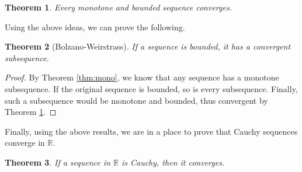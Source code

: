 \documentclass[11pt]{article}
\newcommand{\R}{\ensuremath{\mathbb R}}
\theoremstyle{plain}
\newtheorem{thm}{Theorem}[section]
\theoremstyle{definition}
\theoremstyle{remark}
\begin{document}
\begin{thm}
    Every monotone and bounded sequence converges.
    \label{thm:monobound}
\end{thm}
Using the above ideas, we can prove the following.
\begin{thm}[Bolzano-Weirstrass]
    If a sequence is bounded, it has a convergent subsequence.
    \label{thm:bw}
\end{thm}
\begin{proof}
    By Theorem \ref{thm:mono}, we know that any sequence has a monotone subsequence. If the original sequence is bounded, so is every subsequence. Finally, such a subsequence would be monotone and bounded, thus convergent by Theorem \ref{thm:monobound}.
\end{proof}
Finally, using the above results, we are in a place to prove that Cauchy sequences converge in $\R$.
\begin{thm}
    If a sequence in $\R$ is Cauchy, then it converges.
\end{thm}
\end{document}
